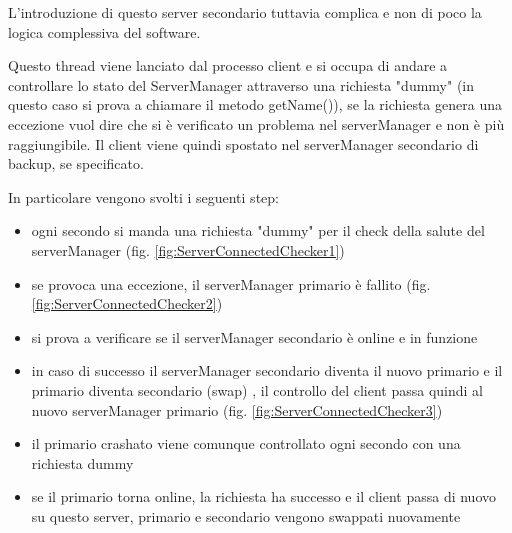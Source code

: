 \documentclass[]{article}
\begin{document}
\vspace{0.5cm}

L'introduzione di questo server secondario tuttavia complica e non di poco la logica complessiva del software.

Questo thread viene lanciato dal processo client e si occupa di andare a controllare lo stato del ServerManager attraverso una richiesta "dummy" (in questo caso si prova a chiamare il metodo getName()), se la richiesta genera una eccezione vuol dire che si è verificato un problema nel serverManager e non è più raggiungibile. Il client viene quindi spostato nel serverManager secondario di backup, se specificato.

In particolare vengono svolti i seguenti step:

\begin{itemize}
	\item ogni secondo si manda una richiesta "dummy" per il check della salute del serverManager (fig. \ref{fig:ServerConnectedChecker1})
	\item se provoca una eccezione, il serverManager primario è fallito (fig. \ref{fig:ServerConnectedChecker2})
	\item si prova a verificare se il serverManager secondario è online e in funzione
	\item in caso di successo il serverManager secondario diventa il nuovo primario e il primario diventa secondario (swap) , il controllo del client passa quindi al nuovo serverManager primario (fig. \ref{fig:ServerConnectedChecker3})
	\item il primario crashato viene comunque controllato ogni secondo con una richiesta dummy
	\item se il primario torna online, la richiesta ha successo e il client passa di nuovo su questo server, primario e secondario vengono swappati nuovamente
\end{itemize}
\end{document}
